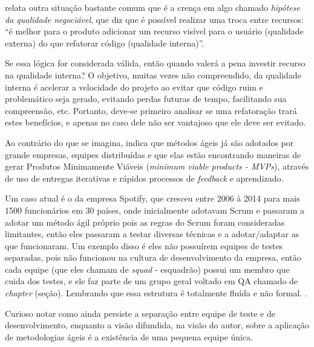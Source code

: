 \documentclass[
	12pt,				%
	openright,			%
	oneside,			%
	a4paper,			%
	english,			%
	brazil,				%
	]{abntex2}
\begin{document}
 relata outra situação bastante comum que é a crença em algo chamado \emph{hipótese da qualidade negociável}, que diz que é possível realizar uma troca entre recursos: ``é melhor para o produto adicionar um recurso visível para o usuário (qualidade externa) do que refatorar código (qualidade interna)''.

Se essa lógica for considerada válida, então quando valerá a pena investir recurso na qualidade interna? O objetivo, muitas vezes não compreendido, da qualidade interna é acelerar a velocidade do projeto ao evitar que código ruim e problemático seja gerado, evitando perdas futuras de tempo, facilitando sua compreensão, etc. Portanto, deve-se primeiro analisar se uma refatoração trará estes benefícios, e apenas no caso dele não ser vantajoso que ele deve ser evitado.

Ao contrário do que se imagina,  indica que métodos ágeis já são adotados por grande empresas, equipes distribuídas e que elas estão encontrando maneiras de gerar Produtos Minimamente Viáveis (\emph{minimum viable products - MVPs}), através de uso de entregas iterativas e rápidos processos de \emph{feedback} e aprendizado.

Um caso atual é o da empresa Spotify, que cresceu entre 2006 à 2014 para mais 1500 funcionários em 30 países, onde inicialmente adotavam Scrum e passaram a adotar um método ágil próprio pois as regras do Scrum foram consideradas limitantes, então eles passaram a testar diversas técnicas e a adotar/adaptar as que funcionaram. Um exemplo disso é eles não possuírem equipes de testes separadas, pois não funcionou na cultura de desenvolvimento da empresa, então cada equipe (que eles chamam de \emph{squad} - esquadrão) possui um membro que cuida dos testes, e ele faz parte de um grupo geral voltado em QA chamado de \emph{chapter} (seção). Lembrando que essa estrutura é totalmente fluída e não formal. \cite{spotify2014}. %

Curioso notar como ainda persiste a separação entre equipe de teste e de desenvolvimento, enquanto a visão difundida, na visão do autor, sobre a aplicação de metodologias ágeis é a existência de uma pequena equipe única.
\end{document}
